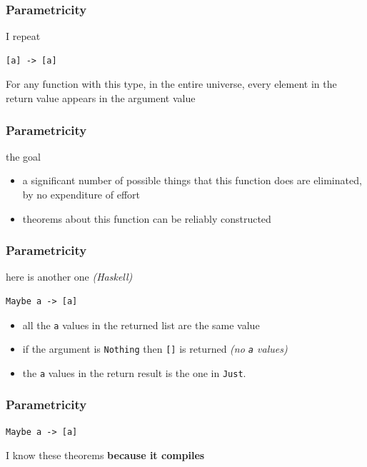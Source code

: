 \begin{frame}[fragile]
\frametitle{Parametricity}
\begin{block}{I repeat}
\begin{lstlisting}
[a] -> [a]
\end{lstlisting}
\end{block}
For any function with this type, in the entire universe, every element in the return value appears in the argument value
\end{frame}

\begin{frame}[fragile]
\frametitle{Parametricity}
\begin{block}{the goal}
\begin{itemize}
  \item<1-> a significant number of possible things that this function does are eliminated, by no expenditure of effort
  \item<2-> theorems about this function can be reliably constructed
\end{itemize}
\end{block}
\end{frame}

\begin{frame}[fragile]
\frametitle{Parametricity}
\begin{block}{here is another one \emph{(Haskell)}}
\begin{lstlisting}
Maybe a -> [a]
\end{lstlisting}
\end{block}
\begin{itemize}
  \item<1-> all the \lstinline{a} values in the returned list are the same value
  \item<2-> if the argument is \lstinline{Nothing} then \lstinline{[]} is returned \emph{(no \lstinline{a} values)}
  \item<3-> the \lstinline{a} values in the return result is the one in \lstinline{Just}.
\end{itemize}
\end{frame}

\begin{frame}[fragile]
\frametitle{Parametricity}
\begin{center}
\begin{lstlisting}
Maybe a -> [a]
\end{lstlisting}
\end{center}
\begin{block}{I know these theorems}
\textbf{because it compiles}
\end{block}
\end{frame}

